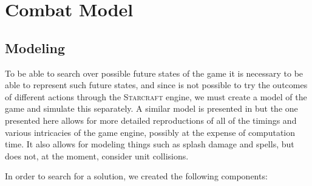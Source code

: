 \section{Combat Model}

\subsection{Modeling}
To be able to search over possible future states of the game it is necessary to be able to represent such future states,
and since is not possible to try the outcomes of different actions through the \textsc{Starcraft} engine, 
we must create a model of the game and simulate this separately.
A similar model is presented in \cite{portfolio} but the one presented here allows for more detailed reproductions of all of the timings and various intricacies of the game engine, possibly at the expense of computation time.
It also allows for modeling things such as splash damage and spells, but does not, at the moment, consider unit collisions.

In order to search for a solution, we created the following components:

